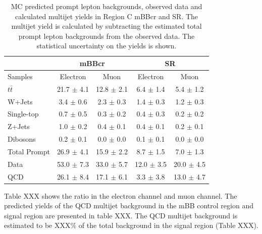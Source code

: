 \begin{table}
\begin{center}
\begin{tabular}{l|c|c||c|c}
             &\multicolumn{2}{c||}{mBBcr}               &\multicolumn{2}{c}{SR}\\
\hline
Samples       & Electron            & Muon               & Electron         & Muon     \\      
\hline
$t\bar{t}$          &   21.7	$\pm$ 4.1   &   12.8 $\pm$ 2.1	&  	6.4 $\pm$ 1.4		& 	5.4 $\pm$ 1.2\\
W+Jets          &   3.4 	$\pm$ 0.6   &    2.3 $\pm$ 0.3	&	1.4 $\pm$ 0.3		&  	1.2 $\pm$ 0.3\\
Single-top      &   0.7 	$\pm$ 0.5   &    0.3 $\pm$ 0.2	&	0.4 $\pm$ 0.3       	&  	0.2 $\pm$ 0.2\\
Z+Jets          &   1.0 	$\pm$ 0.2   &    0.4 $\pm$ 0.1	& 	0.4 $\pm$ 0.1        & 	0.2 $\pm$ 0.1\\
Dibosons   &   0.2 	$\pm$ 0.1   &    0.0 $\pm$ 0.0	&	0.1 $\pm$ 0.1       	& 	0.0 $\pm$ 0.0\\
\hline
Total Prompt         &   26.9 	$\pm$ 4.1   &   15.9 $\pm$ 2.2	&	8.7 $\pm$ 1.5       	& 	7.0 $\pm$ 1.3\\
\hline
Data           &   53.0 $\pm$ 7.3   &   33.0 $\pm$ 5.7	&	12.0 $\pm$ 3.5      	& 	20.0 $\pm$ 4.5\\
\hline
QCD            &   26.1 $\pm$ 8.4   &   17.1 $\pm$ 6.1	&	3.3 $\pm$ 3.8       	& 	13.0 $\pm$ 4.7\\
\end{tabular}
\end{center}
\caption{MC predicted prompt lepton backgrounds, observed data and calculated multijet yields
in Region C mBBcr and SR. The multijet yield is calculated by subtracting the estimated total prompt lepton
backgrounds from the observed data. The statistical uncertainty on the yields is shown.}
\label{tab:boosted_region_c_promptbkgd_data_new}
\end{table}


\indent Table XXX shows the ratio in the electron channel and muon channel.
The predicted yields of the QCD multijet background in the mBB control region and signal region are presented in table XXX. The QCD multijet background is estimated to be XXX\% of the total background in the signal region (Table XXX).

